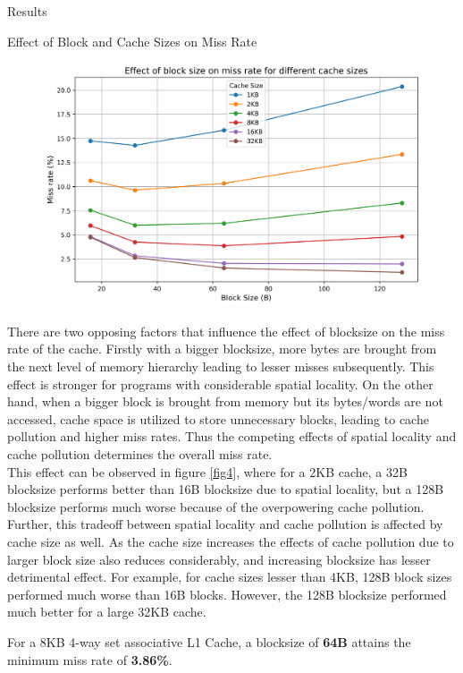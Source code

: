 \begin{section}{Results}
\begin{subsection}{Effect of Block and Cache Sizes on Miss Rate}
    \begin{figure}[h]
        \includegraphics[width=\textwidth]{figures/fig4/fig4.png}
        \centering
        \label{fig:fig4}
    \end{figure}

    There are two opposing factors that influence the effect of blocksize on the miss rate of the cache. Firstly with a bigger blocksize, more bytes are brought from the next level of memory hierarchy leading to lesser misses subsequently. This effect is stronger for programs with considerable spatial locality. On the other hand, when a bigger block is brought from memory but its bytes/words are not accessed, cache space is utilized to store unnecessary blocks, leading to cache pollution and higher miss rates. Thus the competing effects of spatial locality and cache pollution determines the overall miss rate.\\
    This effect can be observed in figure \ref{fig4}, where for a 2KB cache, a 32B blocksize performs better than 16B blocksize due to spatial locality, but a 128B blocksize performs much worse because of the overpowering cache pollution.\\
    Further, this tradeoff between spatial locality and cache pollution is affected by cache size as well. As the cache size increases the effects of cache pollution due to larger block size also reduces considerably, and increasing blocksize has lesser detrimental effect. For example, for cache sizes lesser than 4KB, 128B block sizes performed much worse than 16B blocks. However, the 128B blocksize performed much better for a large 32KB cache.   

    For a 8KB 4-way set associative L1 Cache, a blocksize of \textbf{64B} attains the minimum miss rate of \textbf{3.86\%}.
    

\end{subsection}
\end{section}
